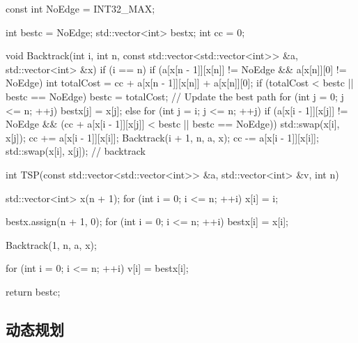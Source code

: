 \begin{cppcode}
const int NoEdge = INT32_MAX;

int bestc = NoEdge;
std::vector<int> bestx;
int cc = 0;

void Backtrack(int i, int n, const std::vector<std::vector<int>> &a, std::vector<int> &x) {
    if (i == n) {
        if (a[x[n - 1]][x[n]] != NoEdge && a[x[n]][0] != NoEdge) {
            int totalCost = cc + a[x[n - 1]][x[n]] + a[x[n]][0];
            if (totalCost < bestc || bestc == NoEdge) {
                bestc = totalCost;
                // Update the best path
                for (int j = 0; j <= n; ++j) {
                    bestx[j] = x[j];
                }
            }
        }
    } else {
        for (int j = i; j <= n; ++j) {
            if (a[x[i - 1]][x[j]] != NoEdge &&
                (cc + a[x[i - 1]][x[j]] < bestc || bestc == NoEdge)) {
                std::swap(x[i], x[j]);
                cc += a[x[i - 1]][x[i]];
                Backtrack(i + 1, n, a, x);
                cc -= a[x[i - 1]][x[i]];
                std::swap(x[i], x[j]); // backtrack
            }
        }
    }
}

int TSP(const std::vector<std::vector<int>> &a, std::vector<int> &v, int n) {
    std::vector<int> x(n + 1);
    for (int i = 0; i <= n; ++i) {
        x[i] = i;
    }

    bestx.assign(n + 1, 0);
    for (int i = 0; i <= n; ++i) {
        bestx[i] = x[i];
    }

    Backtrack(1, n, a, x);

    for (int i = 0; i <= n; ++i) {
        v[i] = bestx[i];
    }

    return bestc;
}
\end{cppcode}

\subsection{动态规划}

